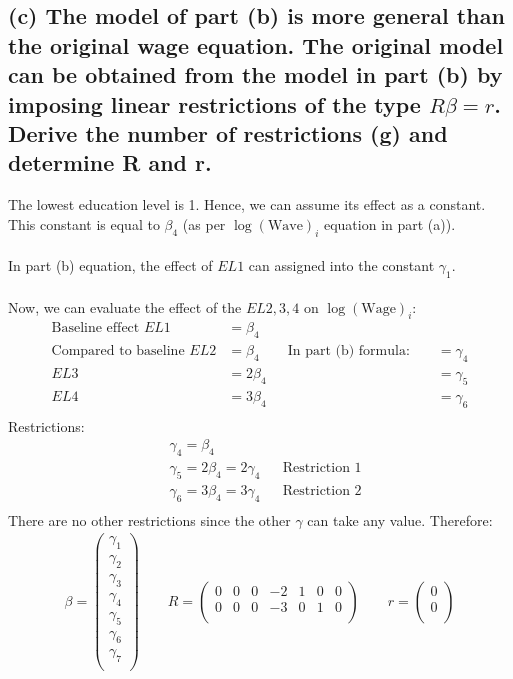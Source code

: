 \documentclass[12pt, a4paper]{article}
\begin{document}
\subsection*{(c) The model of part (b) is more general than the original wage equation. The original model can be obtained from the model in part (b) by imposing linear restrictions of the type $R\beta = r$. Derive the number of restrictions (g) and determine R and r.}
The lowest education level is 1. Hence, we can assume its effect as a constant. This constant is equal to $\beta_4$ (as per $\log(\text{Wave})_i$ equation  in part (a)).\\\\
In part (b) equation, the effect of $EL1$ can assigned into the constant $\gamma_1$.\\\\
Now, we can evaluate the effect of the $EL2, 3, 4$ on $\log(\text{Wage})_i$:
\begin{align*}
    \text{Baseline effect }EL1& = \beta_4\\
    \text{Compared to baseline }EL2& = \beta_4\qquad \text{In part (b) formula: }&& = \gamma_4\\
    EL3& = 2\beta_4&& = \gamma_5\\
    EL4& = 3\beta_4&& = \gamma_6\\
\end{align*}
Restrictions:
\begin{align*}
    &\gamma_4 = \beta_4\\
    &\gamma_5 = 2\beta_4 = 2\gamma_4 && \text{Restriction 1}\\
    &\gamma_6 = 3\beta_4 = 3\gamma_4&& \text{Restriction 2}\\
\end{align*}
There are no other restrictions since the other $\gamma$ can take any value. Therefore:
\begin{align*}
    \beta = \left(\begin{array}{c}
        \gamma_1\\
        \gamma_2\\
        \gamma_3\\
        \gamma_4\\
        \gamma_5\\
        \gamma_6\\
        \gamma_7\\
    \end{array}\right) \qquad
    R = \left(\begin{array}{ccccccc}
        0 & 0 & 0 & -2 & 1 & 0 & 0\\
        0 & 0 & 0 & -3 & 0 & 1 & 0\\
    \end{array}\right) \qquad
    r = \left(\begin{array}{c}
        0\\0\\
    \end{array}\right)
\end{align*}
\vspace{1em}
\end{document}

